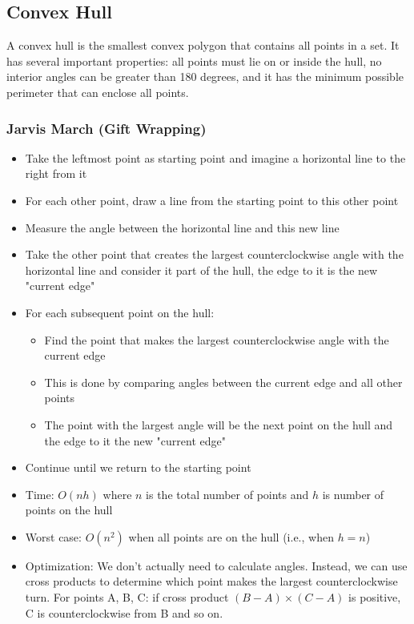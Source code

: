\documentclass[11pt,a4paper]{article}
\begin{document}
\begin{multicols}{2}
\subsection{Convex Hull}
A convex hull is the smallest convex polygon that contains all points in a set.
It has several important properties: all points must lie on or inside the hull, no interior angles can be greater than 180 degrees, and it has the minimum possible perimeter that can enclose all points.

\subsubsection{Jarvis March (Gift Wrapping)}
\begin{itemize}
    \item Take the leftmost point as starting point and imagine a horizontal line to the right from it
    \item For each other point, draw a line from the starting point to this other point
    \item Measure the angle between the horizontal line and this new line
    \item Take the other point that creates the largest counterclockwise angle with the horizontal line and consider it part of the hull, the edge to it is the new "current edge"
    \item For each subsequent point on the hull:
    \begin{itemize}
        \item Find the point that makes the largest counterclockwise angle with the current edge
        \item This is done by comparing angles between the current edge and all other points
        \item The point with the largest angle will be the next point on the hull and the edge to it the new "current edge"
    \end{itemize}
    \item Continue until we return to the starting point
    \item Time: $O(nh)$ where $n$ is the total number of points and $h$ is number of points on the hull
    \item Worst case: $O(n^2)$ when all points are on the hull (i.e., when $h = n$)
    \item Optimization: We don't actually need to calculate angles. Instead, we can use cross products to determine which point makes the largest counterclockwise turn. For points A, B, C: if cross product $(B-A) \times (C-A)$ is positive, C is counterclockwise from B and so on.
\end{itemize}

\end{multicols}
\end{document}

